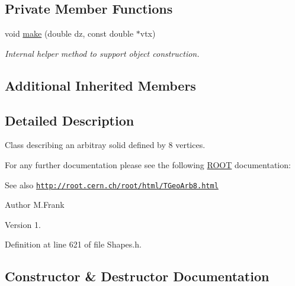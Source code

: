 \subsection*{Private Member Functions}
\begin{DoxyCompactItemize}
\item 
void \hyperlink{class_d_d4hep_1_1_geometry_1_1_eight_point_solid_a037a713544e344700d7f3bd2e29406bb}{make} (double dz, const double $\ast$vtx)
\begin{DoxyCompactList}\small\item\em Internal helper method to support object construction. \end{DoxyCompactList}\end{DoxyCompactItemize}
\subsection*{Additional Inherited Members}


\subsection{Detailed Description}
Class describing an arbitray solid defined by 8 vertices. 

For any further documentation please see the following \hyperlink{namespace_r_o_o_t}{R\+O\+OT} documentation\+: \begin{DoxySeeAlso}{See also}
\href{http://root.cern.ch/root/html/TGeoArb8.html}{\tt http\+://root.\+cern.\+ch/root/html/\+T\+Geo\+Arb8.\+html}
\end{DoxySeeAlso}
\begin{DoxyAuthor}{Author}
M.\+Frank 
\end{DoxyAuthor}
\begin{DoxyVersion}{Version}
1. 
\end{DoxyVersion}


Definition at line 621 of file Shapes.\+h.



\subsection{Constructor \& Destructor Documentation}
\hypertarget{class_d_d4hep_1_1_geometry_1_1_eight_point_solid_a2d5b6ef21dfa195aa13cef05f29be4dc}{}\label{class_d_d4hep_1_1_geometry_1_1_eight_point_solid_a2d5b6ef21dfa195aa13cef05f29be4dc} 
